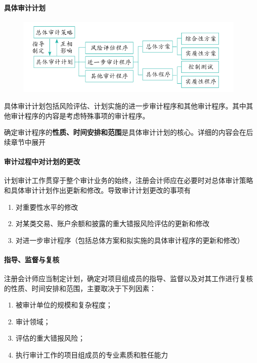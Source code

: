 \documentclass[UTF8,12pt]{ctexart}
\numberwithin{equation}{section} %
\numberwithin{figure}{section}
\numberwithin{table}{section}
\begin{document}
	
	
	
	\paragraph{具体审计计划}
	\begin{figure}[h!]
		\centering
		\includegraphics[width=0.7\linewidth]{screenshot001}
		\caption{}
		\label{fig:screenshot001}
	\end{figure}
	
	具体审计计划包括风险评估、计划实施的进一步审计程序和其他审计程序。其中其他审计程序的内容是考虑特殊事项的审计程序。
	
	确定审计程序的\textbf{性质、时间安排和范围}是具体审计计划的核心。详细的内容会在后续章节中展开
	
	\paragraph{审计过程中对计划的更改}
	计划审计工作贯穿于整个审计业务的始终，注册会计师应在必要时对总体审计策略和具体审计计划作出更新和修改。导致审计计划更改的事项有
	\begin{enumerate}
		\item 对重要性水平的修改
		
		\item 对某类交易、账户余额和披露的重大错报风险评估的更新和修改
		
		\item 对进一步审计程序（包括总体方案和拟实施的具体审计程序的更新和修改）
	\end{enumerate}
	
	\paragraph{指导、监督与复核}
	注册会计师应当制定计划，确定对项目组成员的指导、监督以及对其工作进行复核的性质、时间安排和范围，主要取决于下列因素：
	\begin{enumerate}
		\item 被审计单位的规模和复杂程度；
		
		\item 审计领域；
		
		\item 评估的重大错报风险；
		
		\item 执行审计工作的项目组成员的专业素质和胜任能力
	\end{enumerate}
\end{document}
